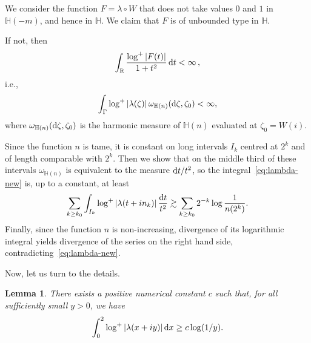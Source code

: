 \documentclass[12pt]{paper}
\newtheorem{lemma}[theorem]{Lemma}
\newcommand{\bR}{\mathbb R}
\newcommand{\bH}{\mathbb H}
\newcommand{\la}{\lambda}
\begin{document}
We consider the function $F=\la \circ W$ that does not take values $0$ and $1$ in
$\bH(-m)$, and hence in $\bH$. We claim that $F$ is of unbounded type in $\bH$.

If not, then
\[
\int_\bR \frac{\log^+|F(t)|}{1+t^2}\, {\rm d}t < \infty\,,
\]
i.e.,
\begin{equation}\label{eq:lambda-new}
\int_\Gamma \log^+|\la (\zeta)|\, \omega_{\bH(n)}({\rm d}\zeta, \zeta_0) <\infty,
\end{equation}
where $\omega_{\bH(n)}({\rm d}\zeta, \zeta_0)$ is the harmonic measure of $\bH(n)$
evaluated at $\zeta_0 = W(i)$.

Since the function $n$ is tame, it is constant on long intervals $I_k$ centred at $2^k$ 
and of length comparable with $2^k$. Then we show that on the middle third of these
intervals  $\omega_{\bH(n)}$ is equivalent to the measure ${\rm d} t/t^2$, so the 
integral~\eqref{eq:lambda-new} is, up to a constant, at least
\[
\sum_{k\ge k_0} \int_{I_k} \log^+|\la(t+in_k)|\, \frac{{\rm d}t}{t^2}
\gtrsim \sum_{k\ge k_0} 2^{-k} \log\frac1{n(2^k)}.
\]
Finally, since the function $n$ is non-increasing, divergence of its logarithmic integral yields
divergence of the series on the right hand side, contradicting~\eqref{eq:lambda-new}.

\smallskip
Now, let us turn to the details.


\begin{lemma}\label{lemmaC}
There exists a positive numerical constant $c$ such that,
for all sufficiently small $y>0$, we have
\[
\int_0^2 \log^+ |\lambda(x+iy)|\, {\rm d}x \ge c \log (1/y).
\]
\end{lemma}
\end{document}

